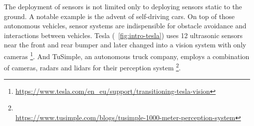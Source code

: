 The deployment of sensors is not limited only to deploying sensors static to the ground.
A notable example is the advent of self-driving cars.
On top of those autonomous vehicles, sensor systems are indispensible for obstacle avoidance and interactions between vehicles.
Tesla (~\ref{fig:intro-tesla}) uses 12 ultrasonic sensors 
near the front and rear bumper 
and later changed into a vision system with only cameras 
\footnote{\url{https://www.tesla.com/en_eu/support/transitioning-tesla-vision}}. 
And TuSimple, an autonomous truck company, employs a combination of cameras, radars and lidars 
for their perception system \footnote{\\\url{https://www.tusimple.com/blogs/tusimple-1000-meter-perception-system}}. 

\begin{figure}[ht] 
    \centering 


\end{figure}
